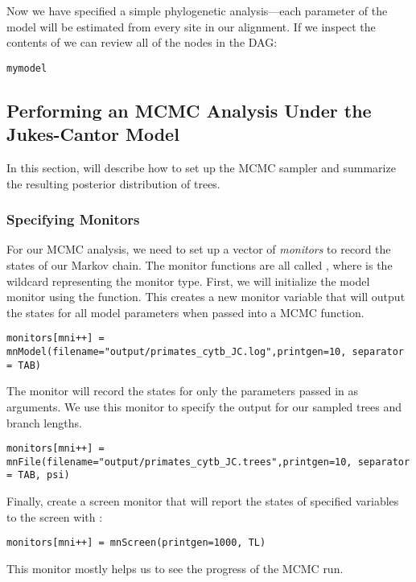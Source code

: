 Now we have specified a simple phylogenetic analysis---each parameter of the model will be estimated from every site in our alignment.
If we inspect the contents of  we can review all of the nodes in the DAG:
{\tt \begin{snugshade*}
\begin{lstlisting}
mymodel
\end{lstlisting}
\end{snugshade*}}

\bigskip
\subsection{Performing an MCMC Analysis Under the Jukes-Cantor Model}

In this section, will describe how to set up the MCMC sampler and summarize the resulting posterior distribution of trees. 

\subsubsection{Specifying Monitors}

For our MCMC analysis, we need to set up a vector of \textit{monitors} to record the states of our Markov chain. 
The monitor functions are all called , where \cl{*} is the wildcard representing the monitor type.
First, we will initialize the model monitor using the  function. This creates a new monitor variable that will output the states for all model parameters when passed into a MCMC function. 
{\tt \begin{snugshade*}
\begin{lstlisting}
monitors[mni++] = mnModel(filename="output/primates_cytb_JC.log",printgen=10, separator = TAB)
\end{lstlisting}
\end{snugshade*}}

The  monitor will record the states for only the parameters passed in as arguments. We use this monitor to specify the output for our sampled trees and branch lengths.

{\tt \begin{snugshade*}
\begin{lstlisting}
monitors[mni++] = mnFile(filename="output/primates_cytb_JC.trees",printgen=10, separator = TAB, psi)
\end{lstlisting}
\end{snugshade*}}


Finally, create a screen monitor that will report the states of specified variables to the screen with :
{\tt \begin{snugshade*}
\begin{lstlisting}
monitors[mni++] = mnScreen(printgen=1000, TL)
\end{lstlisting}
\end{snugshade*}}
This monitor mostly helps us to see the progress of the MCMC run.

